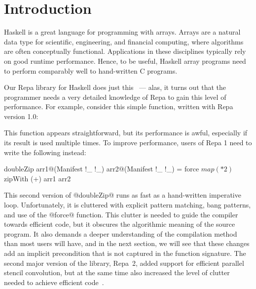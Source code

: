 
\section{Introduction}
\label{section:Introduction}
\label{section:doubleZip}

Haskell is a great language for programming with arrays. Arrays are a natural data type for scientific, engineering, and financial computing, where algorithms are often conceptually functional. Applications in these disciplines typically rely on good runtime performance. Hence, to be useful, Haskell array programs need to perform comparably well to hand-written C programs.

Our Repa library for Haskell does just this~\cite{Keller:Repa, Lippmeier:Stencil} --- alas, it turns out that 
the programmer needs a very detailed knowledge of Repa to gain this level of performance.  For example, consider this simple function, written with Repa version 1.0:
\par
\begin{small}
\end{small}
%
This function appears straightforward, but its performance is awful, especially if its result is used multiple times. To improve performance, users of Repa 1 need to write the following instead:
%
\begin{small}
\begin{code}
  doubleZip arr1@(Manifest !_ !_) arr2@(Manifest !_ !_)
   = force $ map (* 2) $ zipWith (+) arr1 arr2
\end{code}
\end{small}
%
This second version of @doubleZip@ runs as fast as a hand-written imperative loop. Unfortunately, it is cluttered with explicit pattern matching, bang patterns, and use of the @force@ function. This clutter is needed to guide the compiler towards efficient code, but it obscures the algorithmic meaning of the source program. It also demands a deeper understanding of the compilation method than most users will have, and in the next section, we will see that these changes add an implicit precondition that is not captured in the function signature. The second major version of the library, Repa~2, added support for efficient parallel stencil convolution, but at the same time also increased the level of clutter needed to achieve efficient code~\cite{Lippmeier:Stencil}.

